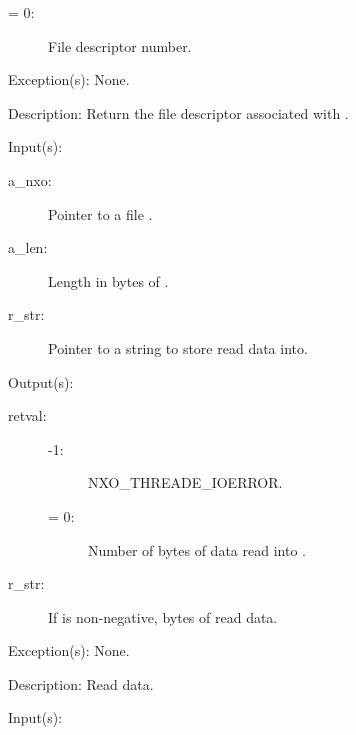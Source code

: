\begin{capi}
\begin{capilist}
\begin{description}
\begin{description}
			\item[{\gt}= 0: ]
				File descriptor number.
			\end{description}
		\end{description}
	\item[Exception(s): ] None.
	\item[Description: ]
		Return the file descriptor associated with .
	\end{capilist}
\label{nxo_file_read}
	\begin{capilist}
	\item[Input(s): ]
		\begin{description}\item[]
		\item[a\_nxo: ]
			Pointer to a file .
		\item[a\_len: ]
			Length in bytes of .
		\item[r\_str: ]
			Pointer to a string to store read data into.
		\end{description}
	\item[Output(s): ]
		\begin{description}\item[]
		\item[retval: ]
			\begin{description}\item[]
			\item[-1: ]
				{NXO_THREADE_IOERROR}.
			\item[{\gt}= 0: ]
				Number of bytes of data read into .
			\end{description}\item[]
		\item[r\_str: ]
			If  is non-negative,  bytes of
			read data.
		\end{description}
	\item[Exception(s): ] None.
	\item[Description: ]
		Read data.
	\end{capilist}
\label{nxo_file_readline}
	\begin{capilist}
	\item[Input(s): ]

\end{capilist}
\end{capi}
